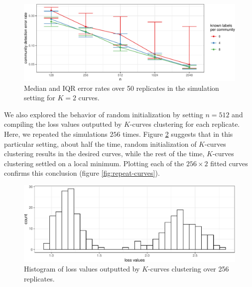 \documentclass[
  12pt,
]{article}
\theoremstyle{definition}
\theoremstyle{definition}
\theoremstyle{definition}
\theoremstyle{definition}
\theoremstyle{remark}
\begin{document}
\begin{figure}[H]

{\centering \includegraphics{draft_files/figure-latex/sim-curves-1} 

}

\caption{Median and IQR error rates over 50 replicates in the simulation setting for $K = 2$ curves.}\label{fig:sim-curves}
\end{figure}

We also explored the behavior of random initialization by setting \(n = 512\) and compiling the loss values outputted by \(K\)-curves clustering for each replicate.
Here, we repeated the simulations \(256\) times.
Figure \ref{fig:repeat-losses} suggests that in this particular setting, about half the time, random initialization of \(K\)-curves clustering results in the desired curves, while the rest of the time, \(K\)-curves clustering settled on a local minimum.
Plotting each of the \(256 \times 2\) fitted curves confirms this conclusion (figure \ref{fig:repeat-curves}).

\begin{figure}[H]

{\centering \includegraphics{draft_files/figure-latex/repeat-losses-1} 

}

\caption{Histogram of loss values outputted by $K$-curves clustering over 256 replicates.}\label{fig:repeat-losses}
\end{figure}
\end{document}
